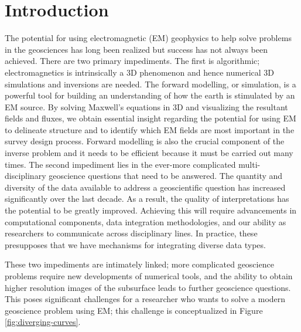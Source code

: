 \documentclass[paper]{geophysics}
\begin{document}
\renewcommand{\figdir}{./figures} %

\section{Introduction}

The potential for using electromagnetic (EM) geophysics to help solve problems in the geosciences has long been realized but success has not always been achieved. There are two primary impediments. The first is algorithmic; electromagnetics is intrinsically a 3D phenomenon and hence numerical 3D simulations and inversions are needed. The forward modelling, or simulation, is a powerful tool for building an understanding of how the earth is stimulated by an EM source. By solving Maxwell's equations in 3D and visualizing the resultant fields and fluxes, we obtain essential insight regarding the potential for using EM to delineate structure and to identify which EM fields are most important in the survey design process. Forward modelling is also the crucial component of the inverse problem and it needs to be efficient because it must be carried out many times. The second impediment lies in the ever-more complicated multi-disciplinary geoscience questions that need to be answered. The quantity and diversity of the data available to address a geoscientific question has increased significantly over the last decade. As a result, the quality of interpretations has the potential to be greatly improved. Achieving this will require advancements in computational components, data integration methodologies, and our ability as researchers to communicate across disciplinary lines. In practice, these presupposes that we have mechanisms for integrating diverse data types.

These two impediments are intimately linked; more complicated geoscience problems require new developments of numerical tools, and the ability to obtain higher resolution images of the subsurface leads to further geoscience questions. This poses significant challenges for a researcher who wants to solve a modern geoscience problem using EM; this challenge is conceptualized in Figure \ref{fig:diverging-curves}.
\end{document}
